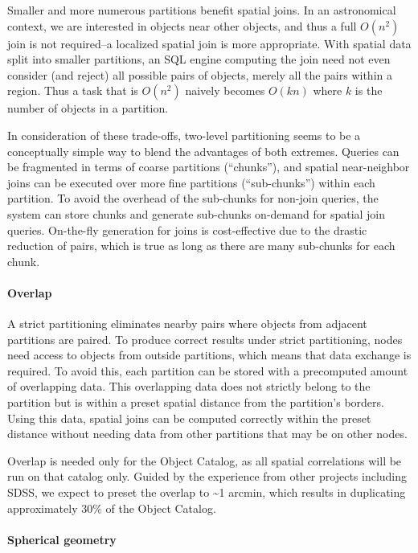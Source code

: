 \documentclass[DM,lsstdraft,toc]{lsstdoc}
\begin{document}
Smaller and more numerous partitions benefit spatial joins. In an
astronomical context, we are interested in objects near other objects,
and thus a full \(O(n^2)\) join is not required--a localized spatial
join is more appropriate. With spatial data split into smaller
partitions, an SQL engine computing the join need not even consider (and
reject) all possible pairs of objects, merely all the pairs within a
region. Thus a task that is \(O(n^2)\) naively becomes \(O(kn)\) where
\(k\) is the number of objects in a partition.

In consideration of these trade-offs, two-level partitioning seems to be
a conceptually simple way to blend the advantages of both extremes.
Queries can be fragmented in terms of coarse partitions (``chunks''),
and spatial near-neighbor joins can be executed over more fine
partitions (``sub-chunks'') within each partition. To avoid the overhead
of the sub-chunks for non-join queries, the system can store chunks and
generate sub-chunks on-demand for spatial join queries. On-the-fly
generation for joins is cost-effective due to the drastic reduction of
pairs, which is true as long as there are many sub-chunks for each
chunk.

\paragraph{Overlap}\label{overlap}

A strict partitioning eliminates nearby pairs where objects from
adjacent partitions are paired. To produce correct results under strict
partitioning, nodes need access to objects from outside partitions,
which means that data exchange is required. To avoid this, each
partition can be stored with a precomputed amount of overlapping data.
This overlapping data does not strictly belong to the partition but is
within a preset spatial distance from the partition's borders. Using
this data, spatial joins can be computed correctly within the preset
distance without needing data from other partitions that may be on other
nodes.

Overlap is needed only for the Object Catalog, as all spatial
correlations will be run on that catalog only. Guided by the experience
from other projects including SDSS, we expect to preset the overlap to
\textasciitilde{}1 arcmin, which results in duplicating approximately
30\% of the Object Catalog.

\paragraph{Spherical geometry}\label{spherical-geometry}
\end{document}
